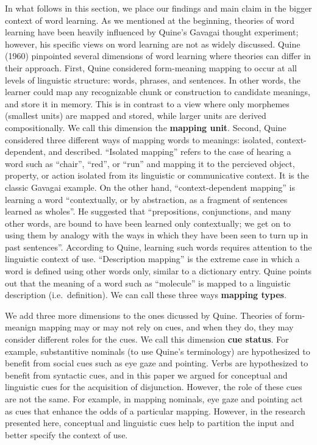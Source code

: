 \documentclass[,man,floatsintext]{apa6}
\begin{document}
In what follows in this section, we place our findings and main claim in the bigger context of word learning. As we mentioned at the beginning, theories of word learning have been heavily influenced by Quine's Gavagai thought experiment; however, his specific views on word learning are not as widely discussed. Quine (1960) pinpointed several dimensions of word learning where theories can differ in their approach. First, Quine considered form-meaning mapping to occur at all levels of linguistic structure: words, phrases, and sentences. In other words, the learner could map any recognizable chunk or construction to candidate meanings, and store it in memory. This is in contrast to a view where only morphemes (smallest units) are mapped and stored, while larger units are derived compositionally. We call this dimension the \textbf{mapping unit}. Second, Quine considered three different ways of mapping words to meanings: isolated, context-dependent, and described. \enquote{Isolated mapping} refers to the case of hearing a word such as \enquote{chair}, \enquote{red}, or \enquote{run} and mapping it to the percieved object, property, or action isolated from its linguistic or communicative context. It is the classic Gavagai example. On the other hand, \enquote{context-dependent mapping} is learning a word \enquote{contextually, or by abstraction, as a fragment of sentences learned as wholes}. He suggested that \enquote{prepositions, conjunctions, and many other words, are bound to have been learned only contextually; we get on to using them by analogy with the ways in which they have been seen to turn up in past sentences}. According to Quine, learning such words requires attention to the linguistic context of use. \enquote{Description mapping} is the extreme case in which a word is defined using other words only, similar to a dictionary entry. Quine points out that the meaning of a word such as \enquote{molecule} is mapped to a linguistic description (i.e.~definition). We can call these three ways \textbf{mapping types}.

We add three more dimensions to the ones dicussed by Quine. Theories of form-meanign mapping may or may not rely on cues, and when they do, they may consider different roles for the cues. We call this dimension \textbf{cue status}. For example, substantitive nominals (to use Quine's terminology) are hypothesized to benefit from social cues such as eye gaze and pointing. Verbs are hypothesized to benefit from syntactic cues, and in this paper we argued for conceptual and linguistic cues for the acquisition of disjunction. However, the role of these cues are not the same. For example, in mapping nominals, eye gaze and pointing act as cues that enhance the odds of a particular mapping. However, in the research presented here, conceptual and linguistic cues help to partition the input and better specify the context of use.
\end{document}

